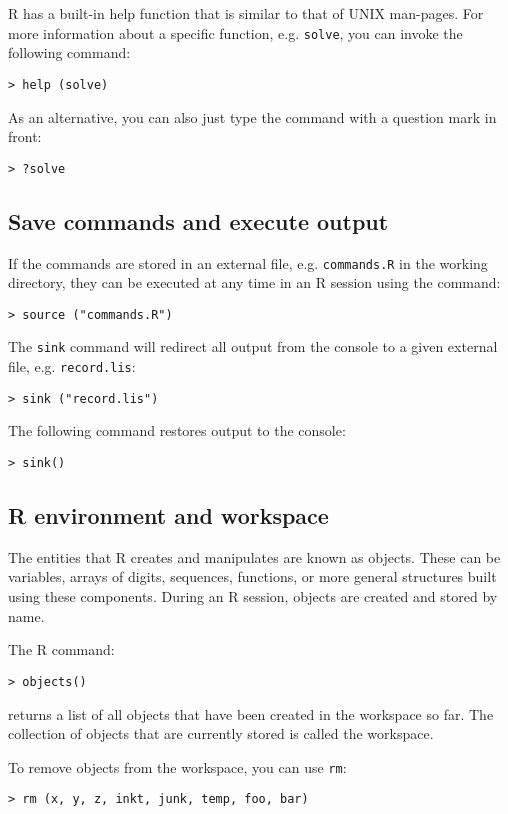 R has a built-in help function that is similar to that of UNIX man-pages. For more information about a specific function, e.g. \texttt{solve}, you can invoke the following command:
\begin{lstlisting}
> help (solve)
\end{lstlisting}

As an alternative, you can also just type the command with a question mark in front:
\begin{lstlisting}
> ?solve
\end{lstlisting}


\subsection{Save commands and execute output}

If the commands are stored in an external file, e.g. \texttt{commands.R} in the working directory, they can be executed at any time in an R session using the command:
\begin{lstlisting}
> source ("commands.R")
\end{lstlisting}

The \texttt{sink} command will redirect all output from the console to a given external file, e.g. \texttt{record.lis}:
\begin{lstlisting}
> sink ("record.lis")
\end{lstlisting}

The following command restores output to the console:
\begin{lstlisting}
> sink()
\end{lstlisting}

\subsection{R environment and workspace}

The entities that R creates and manipulates are known as objects. These can be variables, arrays of digits, sequences, functions, or more general structures built using these components. During an R session, objects are created and stored by name.

The R command:
\begin{lstlisting}
> objects()
\end{lstlisting}
returns a list of all objects that have been created in the workspace so far.
The collection of objects that are currently stored is called the workspace.

To remove objects from the workspace, you can use \texttt{rm}:
\begin{lstlisting}
> rm (x, y, z, inkt, junk, temp, foo, bar)
\end{lstlisting}

